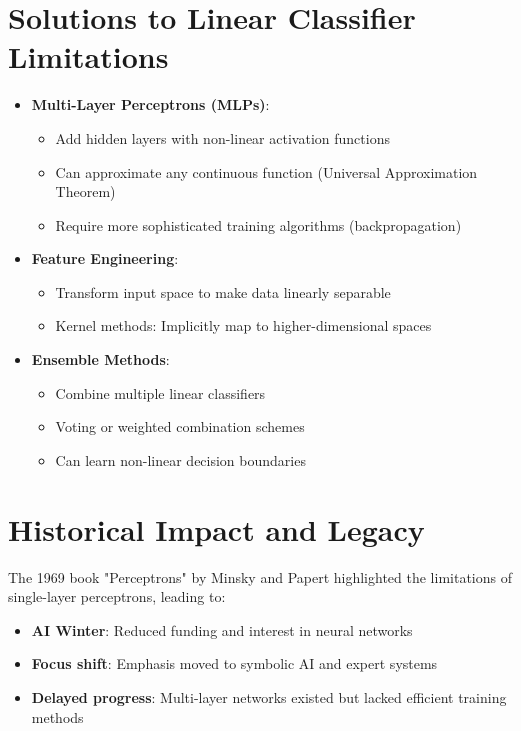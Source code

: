 \section{Solutions to Linear Classifier Limitations}
\begin{itemize}
    \item \textbf{Multi-Layer Perceptrons (MLPs)}:
    \begin{itemize}
        \item Add hidden layers with non-linear activation functions
        \item Can approximate any continuous function (Universal Approximation Theorem)
        \item Require more sophisticated training algorithms (backpropagation)
    \end{itemize}
    
    \item \textbf{Feature Engineering}:
    \begin{itemize}
        \item Transform input space to make data linearly separable
        \item Kernel methods: Implicitly map to higher-dimensional spaces
    \end{itemize}
    
    \item \textbf{Ensemble Methods}:
    \begin{itemize}
        \item Combine multiple linear classifiers
        \item Voting or weighted combination schemes
        \item Can learn non-linear decision boundaries
    \end{itemize}
\end{itemize}

\section{Historical Impact and Legacy}
The 1969 book "Perceptrons" by Minsky and Papert highlighted the limitations of single-layer perceptrons, leading to:
\begin{itemize}
    \item \textbf{AI Winter}: Reduced funding and interest in neural networks
    \item \textbf{Focus shift}: Emphasis moved to symbolic AI and expert systems
    \item \textbf{Delayed progress}: Multi-layer networks existed but lacked efficient training methods
\end{itemize}

